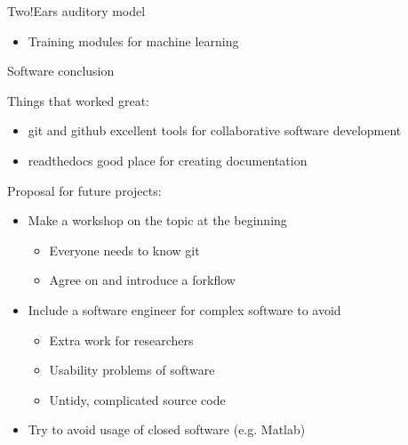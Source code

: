 \documentclass{beamer}
\begin{document}
\begin{frame}{Two!Ears auditory model}
\begin{minipage}[b]{0.56\columnwidth}
        \begin{itemize}
            \item Training modules for machine learning
        \end{itemize}

    \end{minipage}

\end{frame}

\begin{frame}{Software conclusion}

    Things that worked great:
    \begin{itemize}
        \item git and github excellent tools for collaborative software development
        \item readthedocs good place for creating documentation
    \end{itemize}

    \vspace{0.6cm}

    Proposal for future projects:
    \begin{itemize}
        \item Make a workshop on the topic at the beginning
            \begin{itemize}
                \item Everyone needs to know git
                \item Agree on and introduce a forkflow
            \end{itemize}
        \item Include a software engineer for complex software to avoid
            \begin{itemize}
                \item Extra work for researchers
                \item Usability problems of software
                \item Untidy, complicated source code
            \end{itemize}
        \item Try to avoid usage of closed software (e.g. Matlab)
    \end{itemize}

\end{frame}
\end{document}
